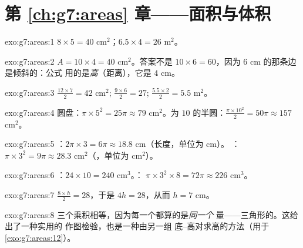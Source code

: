 \section*{第 \ref{ch:g7:areas} 章——面积与体积}

\begin{solution}{exo:g7:areas:1}
$8 \times 5 = 40$ cm$^2$；\qquad $6.5 \times 4 = 26$ m$^2$。
\end{solution}

\begin{solution}{exo:g7:areas:2}
$A = 10 \times 4 = 40$ cm$^2$。答案不是
$10 \times 6 = 60$，因为 $6$ cm 的那条边是倾斜的：公式
用的是\emph{高}（距离），它是 $4$ cm。
\end{solution}

\begin{solution}{exo:g7:areas:3}
$\frac{12 \times 7}{2} = 42$ cm$^2$; \quad
$\frac{9 \times 6}{2} = 27$; \quad
$\frac{5.5 \times 2}{2} = 5.5$ m$^2$。
\end{solution}

\begin{solution}{exo:g7:areas:4}
圆盘：$\pi \times 5^2 = 25\pi \approx 79$ cm$^2$。为
$10$ 的半圆：$\frac{\pi \times 10^2}{2} = 50\pi \approx 157$ cm$^2$。
\end{solution}

\begin{solution}{exo:g7:areas:5}
：$2\pi \times 3 = 6\pi \approx 18.8$ cm（长度，单位为 cm）。
：$\pi \times 3^2 = 9\pi \approx 28.3$ cm$^2$（，单位为
cm$^2$）。
\end{solution}

\begin{solution}{exo:g7:areas:6}
：$24 \times 10 = 240$ cm$^3$。：
$\pi \times 3^2 \times 8 = 72\pi \approx 226$ cm$^3$。
\end{solution}

\begin{solution}{exo:g7:areas:7}
$\frac{8 \times h}{2} = 28$，于是 $4h = 28$，从而 $h = 7$ cm。
\end{solution}

\begin{solution}{exo:g7:areas:8}
三个乘积相等，因为每一个都算的是\emph{同一个}
量——三角形的。这给出了一种实用的
作图检验，也是一种由另一组
底--高对求高的方法（用于\cref{exo:g7:areas:12}）。
\end{solution}

